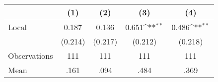 {
\def\sym#1{\ifmmode^{#1}\else\(^{#1}\)\fi}
\begin{tabular}{l*{4}{c}}
\hline\hline
                &\multicolumn{1}{c}{(1)}         &\multicolumn{1}{c}{(2)}         &\multicolumn{1}{c}{(3)}         &\multicolumn{1}{c}{(4)}         \\
\hline
Local           &    0.187         &    0.136         &    0.651\sym{**} &    0.486\sym{**} \\
                &  (0.214)         &  (0.217)         &  (0.212)         &  (0.218)         \\
\hline
Observations    &      111         &      111         &      111         &      111         \\
Mean            &     .161         &     .094         &     .484         &     .369         \\
\hline\hline
\end{tabular}
}
